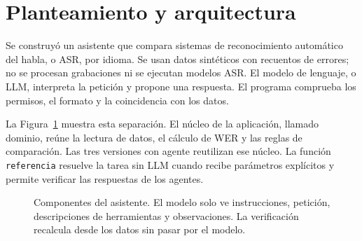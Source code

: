 \section{Planteamiento y arquitectura}

Se construyó un asistente que compara sistemas de reconocimiento automático del habla, o ASR, por idioma. Se usan datos sintéticos con recuentos de errores; no se procesan grabaciones ni se ejecutan modelos ASR. El modelo de lenguaje, o LLM, interpreta la petición y propone una respuesta. El programa comprueba los permisos, el formato y la coincidencia con los datos.

La Figura~\ref{fig:arquitectura} muestra esta separación. El núcleo de la aplicación, llamado dominio, reúne la lectura de datos, el cálculo de WER y las reglas de comparación. Las tres versiones con agente reutilizan ese núcleo. La función \texttt{referencia} resuelve la tarea sin LLM cuando recibe parámetros explícitos y permite verificar las respuestas de los agentes.

\begin{figure}[htbp]
\centering
{}
\caption{Componentes del asistente. El modelo solo ve instrucciones, petición, descripciones de herramientas y observaciones. La verificación recalcula desde los datos sin pasar por el modelo.}
\label{fig:arquitectura}
\end{figure}
